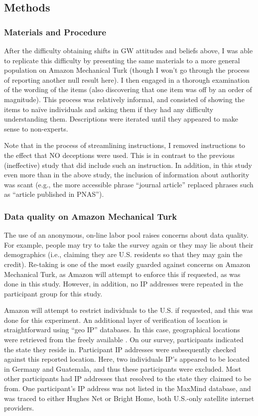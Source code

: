 \subsection{Methods}

\subsubsection{Materials and Procedure}

After the difficulty obtaining shifts in GW attitudes and beliefs above, I was
able to replicate this difficulty by presenting the same materials to a more
general population on Amazon Mechanical Turk (though I won't go through the
process of reporting another null result here). I then engaged in a thorough
examination of the wording of the items (also discovering that one item was off
by an order of magnitude). This process was relatively informal, and consisted
of showing the items to naïve individuals and asking them if they had any
difficulty understanding them. Descriptions were iterated until they appeared to
make sense to non-experts.

Note that in the process of streamlining instructions, I removed instructions to
the effect that NO deceptions were used. This is in contrast to the previous
(ineffective) study that did include such an instruction.  In addition, in this
study even more than in the above study, the inclusion of information about
authority was scant (e.g., the more accessible phrase “journal article” replaced
phrases such as “article published in PNAS”).

\subsubsection{Data quality on Amazon Mechanical Turk}
\label{sec:mturk-problems}

The use of an anonymous, on-line labor pool raises concerns about data quality.
For example, people may try to take the survey again or they may lie about their
demographics (i.e., claiming they are U.S. residents so that they may gain the
credit). Re-taking is one of the most easily guarded against concerns on Amazon
Mechanical Turk, as Amazon will attempt to enforce this if requested, as was
done in this study. However, in addition, no IP addresses were repeated in the
participant group for this study.

Amazon will attempt to restrict individuals to the U.S. if requested, and this
was done for this experiment. An additional layer of verification of location is
straightforward using “geo IP” databases. In this case, geographical locations
were retrieved from the freely available \textcite{maxmind-database}. On our
survey, participants indicated the state they reside in. Participant IP
addresses were subsequently checked against this reported location. Here, two
individuals IP’s appeared to be located in Germany and Guatemala, and thus these
participants were excluded. Most other participants had IP addresses that
resolved to the state they claimed to be from. One participant’s IP address was
not listed in the MaxMind database, and was traced to either Hughes Net or
Bright Home, both U.S.-only satellite internet providers.

